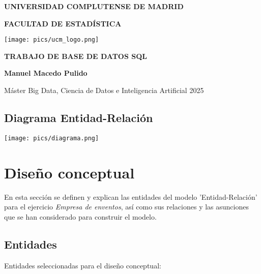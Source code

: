 \documentclass[12pt]{article}
\begin{document}
\begin{titlepage}
        \centering
        { \bfseries \Large UNIVERSIDAD COMPLUTENSE DE MADRID}
        \vspace{0.6cm} 

        {\bfseries  \Large FACULTAD DE ESTADÍSTICA} 
        \vspace{0.6cm}
        
        {\texttt{[image: pics/ucm\_logo.png]}} 
        \vspace{0.6cm}
        
        {\bfseries \Large TRABAJO DE BASE DE DATOS SQL}
        \vspace{1.75cm}
        
        {\bfseries \LARGE Manuel Macedo Pulido}
        \vspace{6mm} 

        {\large Máster Big Data, Ciencia de Datos e Inteligencia Artificial}
        {\large 2025 }
        \vspace{6mm} 
        
    \end{titlepage}

    \newpage
    \tableofcontents

    \newpage
    \begin{landscape}
        \section{Diagrama Entidad-Relación}
        {\texttt{[image: pics/diagrama.png]}} 
    \end{landscape}

    \newpage
    \section{Diseño conceptual}
    En esta sección se definen y explican las entidades del modelo 'Entidad-Relación' para el ejercicio \textit{Empresa de enventos}, 
    así como sus relaciones y las asunciones que se han considerado para construir el modelo. 

    \subsection{Entidades}
    Entidades seleccionadas para el diseño conceptual:
\end{document}
